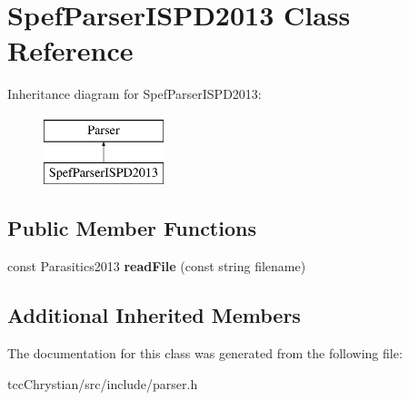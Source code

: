 \hypertarget{classSpefParserISPD2013}{\section{Spef\-Parser\-I\-S\-P\-D2013 Class Reference}
\label{classSpefParserISPD2013}
}
Inheritance diagram for Spef\-Parser\-I\-S\-P\-D2013\-:\begin{figure}[H]
\begin{center}
\leavevmode
\includegraphics[height=2.000000cm]{classSpefParserISPD2013}
\end{center}
\end{figure}
\subsection*{Public Member Functions}
\begin{DoxyCompactItemize}
\item 
\hypertarget{classSpefParserISPD2013_a11c71d121883895a367a99b052aada73}{const Parasitics2013 {\bfseries read\-File} (const string filename)}\label{classSpefParserISPD2013_a11c71d121883895a367a99b052aada73}

\end{DoxyCompactItemize}
\subsection*{Additional Inherited Members}


The documentation for this class was generated from the following file\-:\begin{DoxyCompactItemize}
\item 
tcc\-Chrystian/src/include/parser.\-h\end{DoxyCompactItemize}
